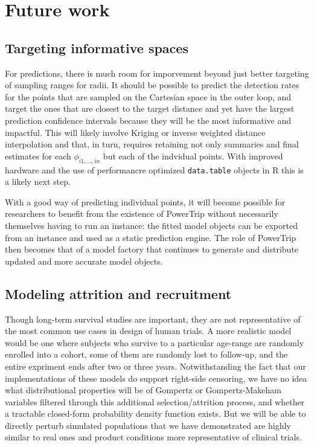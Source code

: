 \documentclass[review, authoryear]{elsarticle}
\begin{document}
\section{Future work}\label{future-work}

\subsection{Targeting informative
spaces}\label{targeting-informative-spaces}

For predictions, there is much room for imporvement beyond just better
targeting of sampling ranges for radii. It should be possible to predict
the detection rates for the points that are sampled on the Cartesian
space in the outer loop, and target the ones that are closest to the
target distance and yet have the largest prediction confidence intervals
because they will be the most informative and impactful. This will
likely involve Kriging or inverse weighted distance interpolation and
that, in turn, requires retaining not only summaries and final estimates
for each \(\phi_{i1,\dots,in}\) but each of the indvidual points. With
improved hardware and the use of performancre optimized
\texttt{data.table} objects in R this is a likely next step.

With a good way of predicting individual points, it will become possible
for researchers to benefit from the existence of PowerTrip without
necessarily themselves having to run an instance: the fitted model
objects can be exported from an instance and used as a static prediction
engine. The role of PowerTrip then becomes that of a model factory that
continues to generate and distribute updated and more accurate model
objects.

\subsection{Modeling attrition and
recruitment}\label{modeling-attrition-and-recruitment}

Though long-term survival studies are important, they are not
representative of the most common use cases in design of human trials. A
more realistic model would be one where subjects who survive to a
particular age-range are randomly enrolled into a cohort, some of them
are randomly lost to follow-up, and the entire expriment ends after two
or three years. Notwithstanding the fact that our implementations of
these models do support right-side censoring, we have no idea what
distributional properties will be of Gompertz or Gompertz-Makeham
variables filtered through this additional selection/attrition process,
and whether a tractable closed-form probability density function exists.
But we will be able to directly perturb simulated populations that we
have demonstrated are highly similar to real ones and product conditions
more representative of clinical trials.
\end{document}
